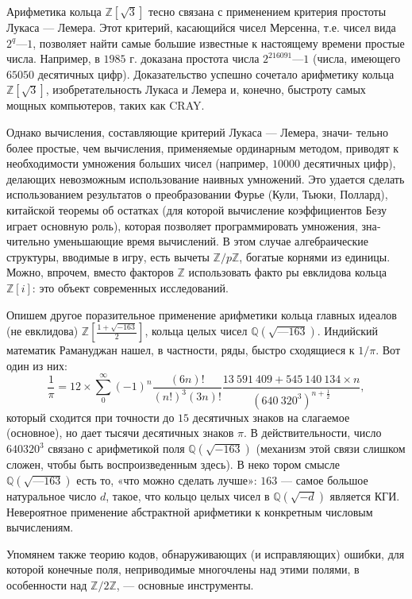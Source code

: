 \pagebreak

Арифметика кольца $\mathbb{Z}[\sqrt{3}]$ тесно связана с применением критерия
простоты Лукаса — Лемера. Этот критерий, касающийся чисел Мерсенна, т.е. чисел вида $2^q—1$, позволяет найти самые большие известные
к настоящему времени простые числа. Например, в $1985$ г. доказана
простота числа $2^{216091}—1$ (числа, имеющего $65050$ десятичных цифр).
Доказательство успешно сочетало арифметику кольца $\mathbb{Z}[\sqrt{3}]$, изобрета­тельность Лукаса и Лемера и, конечно, быстроту самых мощных ком­пьютеров, таких как CRAY.

Однако вычисления, составляющие критерий Лукаса — Лемера, зна­чи-
тельно более простые, чем вычисления, применяемые ординарным
методом, приводят к необходимости умножения больших чисел (напри­мер, $10000$ десятичных цифр), делающих невозможным использование
наивных умножений. Это удается сделать использованием результатов
о преобразовании Фурье (Кули, Тьюки, Поллард), китайской теоре­мы об остатках (для которой вычисление коэффициентов Безу играет
основную роль), которая позволяет программировать умножения, зна­
чительно уменьшающие время вычислений. В этом случае алгебраиче­ские структуры, вводимые в игру, есть вычеты $\mathbb{Z}/p\mathbb{Z}$, богатые корнями
из единицы. Можно, впрочем, вместо факторов $\mathbb{Z}$ использовать факто­
ры евклидова кольца $\mathbb{Z}[i]$: это объект современных исследований.

Опишем другое поразительное применение арифметики кольца
главных идеалов (не евклидова) $\mathbb{Z}[\frac{1+\sqrt{-163}}{2}]$, кольца целых чисел
$\mathbb{Q}(\sqrt{—163})$. Индийский математик Рамануджан нашел, в частности, ря­ды, быстро сходящиеся к $1/\pi$. Вот один из них:
\[
\frac{1}{\pi}=12\times\sum_0^\infty(-1)^n\frac{(6n)!}{(n!)^3(3n)!}\frac{13~591~409 + 545~140~134 \times n}{(640~320^3)^{n+\frac{1}{2}}},
\]
который сходится при точности до $15$ десятичных знаков на слагаемое
(основное), но дает тысячи десятичных знаков $\pi$. В действительности,
число $640320^3$ связано с арифметикой поля $\mathbb{Q}(\sqrt{-163})$ (механизм этой
связи слишком сложен, чтобы быть воспроизведенным здесь). В неко­
тором смысле $\mathbb{Q}(\sqrt{—163})$ есть то, «что можно сделать лучше»: $163$ — самое большое натуральное число $d$, такое, что кольцо целых чисел в $\mathbb{Q}(\sqrt{-d})$ является КГИ. Невероятное применение абстрактной арифметики к конкретным числовым вычислениям.

Упомянем также теорию кодов, обнаруживающих (и исправляющих)
ошибки, для которой конечные поля, неприводимые многочлены над
этими полями, в особенности над $\mathbb{Z}/2\mathbb{Z}$, — основные инструменты.

